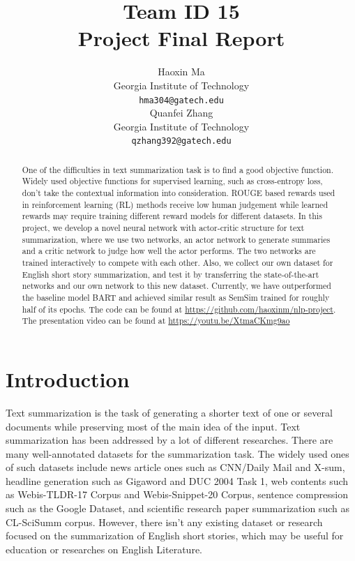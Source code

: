 \documentclass[11pt,a4paper]{article}
\title{Team ID 15\\\bigskip
\large Project Final Report}
\author{Haoxin Ma \\
  Georgia Institute of Technology \\
  \texttt{hma304@gatech.edu} \\\And
  Quanfei Zhang \\
  Georgia Institute of Technology \\
  \texttt{qzhang392@gatech.edu} \\}
\date{}
\begin{document}
\maketitle
\begin{abstract}
One of the difficulties in text summarization task is to find a good objective function. Widely used objective functions for supervised learning, such as cross-entropy loss, don't take the contextual information into consideration. ROUGE based rewards used in reinforcement learning (RL) methods receive low human judgement while learned rewards may require training different reward models for different datasets. In this project, we develop a novel neural network with actor-critic structure for text summarization, where we use two networks, an actor network to generate summaries and a critic network to judge how well the actor performs. The two networks are trained interactively to compete with each other. Also, we collect our own dataset for English short story summarization, and test it by transferring the state-of-the-art networks and our own network to this new dataset. Currently, we have outperformed the baseline model BART and achieved similar result as SemSim trained for roughly half of its epochs. The code can be found at \url{https://github.com/haoxinm/nlp-project}. The presentation video can be found at \url{https://youtu.be/XtmaCKmg9ao}
\end{abstract}

\section{Introduction}
\label{Introduction}
Text summarization is the task of generating a shorter text of one or several documents while preserving most of the main idea of the input. Text summarization has been addressed by a lot of different researches. There are many well-annotated datasets for the summarization task. The widely used ones of such datasets include news article ones such as CNN/Daily Mail\cite{nallapati-etal-2016-abstractive} and X-sum\cite{xsum-emnlp}, headline generation such as Gigaword\cite{graff2003english, Rush_2015} and DUC 2004 Task 1, web contents such as Webis-TLDR-17 Corpus\cite{volske-etal-2017-tl} and Webis-Snippet-20 Corpus\cite{chen2020abstractive}, sentence compression such as the Google Dataset\cite{filippova-altun-2013-overcoming}, and scientific research paper summarization such as CL-SciSumm corpus\cite{scisumm}. However, there isn't any existing dataset or research focused on the summarization of English short stories, which may be useful for education or researches on English Literature. 
\end{document}
